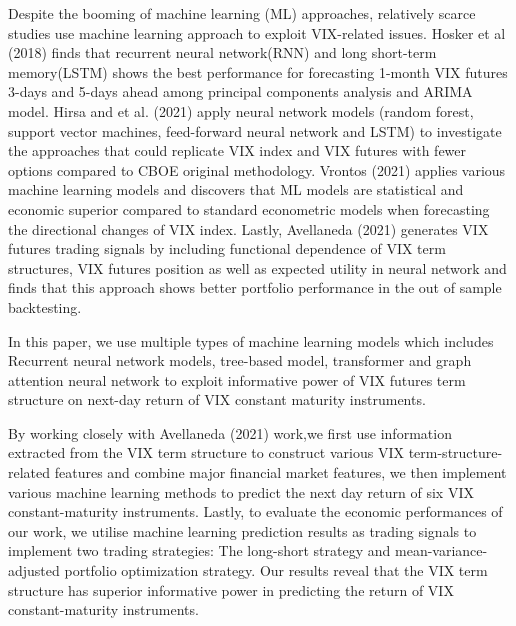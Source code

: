 \documentclass[10pt,letterpaper]{article}
\begin{document}
Despite the booming of machine learning (ML) approaches, relatively scarce studies use machine learning approach to exploit VIX-related issues. Hosker et al (2018) finds that recurrent neural network(RNN) and long short-term memory(LSTM) shows the best performance for forecasting 1-month VIX futures 3-days and 5-days ahead among principal components analysis and ARIMA model. Hirsa and et al. (2021) apply neural network models (random forest, support vector machines, feed-forward neural network and LSTM) to investigate the approaches that could replicate VIX index and VIX futures with fewer options compared to CBOE original methodology. Vrontos (2021) applies various machine learning models and discovers that ML models are statistical and economic superior compared to standard econometric models when forecasting the directional changes of VIX index. Lastly, Avellaneda (2021) generates VIX futures trading signals by including functional dependence of VIX term structures, VIX futures position as well as expected utility in neural network and finds that this approach shows better portfolio performance in the out of sample backtesting.

In this paper, we use multiple types of machine learning models which includes Recurrent neural network models, tree-based model, transformer and graph attention neural network to exploit informative power of VIX futures term structure on next-day return of  VIX constant maturity instruments.


By working closely with Avellaneda (2021) work,we first use information extracted from the VIX term structure to construct various VIX term-structure-related features and combine major financial market features, we then implement various machine learning methods to predict the next day return of six VIX constant-maturity instruments. Lastly, to evaluate the economic performances of our work, we utilise machine learning prediction results as trading signals to implement two trading strategies: The long-short strategy and mean-variance-adjusted portfolio optimization strategy. Our results reveal that the VIX term structure has superior informative power in predicting the return of VIX constant-maturity instruments.
\end{document}
